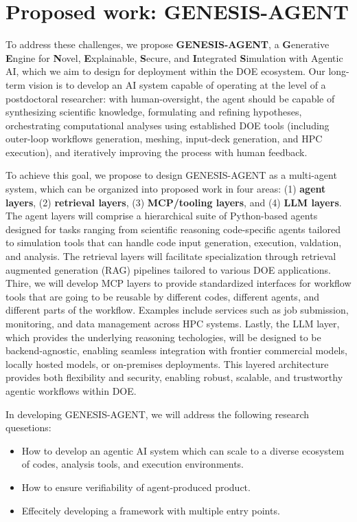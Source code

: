 \documentclass[11pt]{article} \usepackage[margin=1in]{geometry}
\begin{document}
\section*{Proposed work: GENESIS-AGENT}

To address these challenges, we propose \textbf{GENESIS-AGENT}, a
\textbf{G}enerative \textbf{E}ngine for \textbf{N}ovel, \textbf{E}xplainable,
\textbf{S}ecure, and \textbf{I}ntegrated \textbf{S}imulation with Agentic
AI, which we aim to design for deployment within the DOE ecosystem. Our long-term vision is to
develop an AI system capable of operating at the level of a postdoctoral
researcher: with human-oversight, the agent should be capable of synthesizing scientific knowledge, formulating and refining
hypotheses, orchestrating computational analyses using established DOE tools
(including outer-loop workflows generation, meshing, input-deck generation, and
HPC execution), and iteratively improving the process with human feedback. 

To achieve this goal, we propose to design GENESIS-AGENT as a multi-agent
system, which can be organized into proposed work in four areas: (1) 
\textbf{agent layers}, (2) \textbf{retrieval layers}, (3) \textbf{MCP/tooling layers}, and (4) \textbf{LLM
layers}. The agent layers will comprise a hierarchical suite of Python-based agents
designed for tasks ranging from scientific reasoning code-specific agents
tailored to simulation tools that can handle code input generation, execution,
valdation, and analysis. The retrieval layers will facilitate specialization
through retrieval augmented generation (RAG) pipelines tailored to various
DOE applications.  Thire, we will develop MCP layers to provide
standardized interfaces for workflow tools that are going to be reusable by
different codes, different agents, and different parts of the workflow. Examples
include services such as job submission, monitoring, and data management across
HPC systems. Lastly, the LLM layer, which provides the underlying reasoning
techologies, will be designed to be backend-agnostic,
enabling seamless integration with frontier commercial models, locally hosted
models, or on-premises deployments. This layered architecture provides both
flexibility and security, enabling robust, scalable, and trustworthy agentic
workflows within DOE. 

In developing GENESIS-AGENT, we will address the following research quesetions:
\begin{itemize}
\item How to develop an agentic AI system which can scale to a diverse ecosystem
of codes, analysis tools, and execution environments.
\item How to ensure verifiability of agent-produced product.
\item Effecitely developing a framework with multiple entry points.
\end{itemize}
\end{document}
